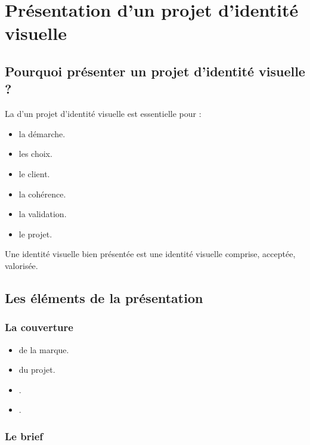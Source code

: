 \section{Présentation d'un projet d'identité visuelle}

\subsection{Pourquoi présenter un projet d'identité visuelle ?}

La  d'un projet d'identité visuelle est essentielle pour :

\begin{itemize}
    \item {} la démarche.
    \item {} les choix.
    \item {} le client.
    \item {} la cohérence.
    \item {} la validation.
    \item {} le projet.
\end{itemize}

Une identité visuelle bien présentée est une identité visuelle comprise, acceptée, valorisée.

\subsection{Les éléments de la présentation}

\subsubsection{La couverture}

\begin{itemize}
    \item {} de la marque.
    \item {} du projet.
    \item {}.
    \item {}.
\end{itemize}

\subsubsection{Le brief}

